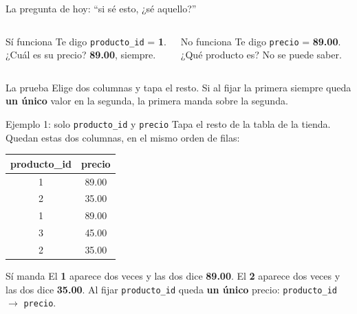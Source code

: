 \documentclass[aspectratio=169,10pt,c]{beamer}
\newcommand{\fdep}{$\rightarrow$}
\begin{document}
\begin{frame}{La pregunta de hoy: ``si sé esto, ¿sé aquello?''}
\begin{columns}[T,onlytextwidth]
\begin{exampleblock}{Sí funciona}
\small Te digo \texttt{producto\_id} = \textbf{1}.\\
¿Cuál es su precio? \textbf{89.00}, siempre.
\end{exampleblock}
\begin{alertblock}{No funciona}
\small Te digo \texttt{precio} = \textbf{89.00}.\\
¿Qué producto es? No se puede saber.
\end{alertblock}
\end{columns}
\vspace{0.45cm}
\begin{block}{La prueba}
Elige dos columnas y tapa el resto. Si al fijar la primera siempre queda \textbf{un único} valor en la segunda, la primera manda sobre la segunda.
\end{block}
\end{frame}

\begin{frame}{Ejemplo 1: solo \texttt{producto\_id} y \texttt{precio}}
\small Tapa el resto de la tabla de la tienda. Quedan estas dos columnas, en el mismo orden de filas:
\vspace{0.25cm}
\begin{center}
\small
\begin{tabular}{cc}
\toprule
\bfseries producto\_id & \bfseries precio \\
\midrule
1 & 89.00 \\
2 & 35.00 \\
1 & 89.00 \\
3 & 45.00 \\
2 & 35.00 \\
\bottomrule
\end{tabular}
\end{center}
\vspace{0.25cm}
\begin{exampleblock}{Sí manda}
\small El \textbf{1} aparece dos veces y las dos dice \textbf{89.00}. El \textbf{2} aparece dos veces y las dos dice \textbf{35.00}. Al fijar \texttt{producto\_id} queda \textbf{un único} precio: \texttt{producto\_id} \fdep{} \texttt{precio}.
\end{exampleblock}
\end{frame}
\end{document}
